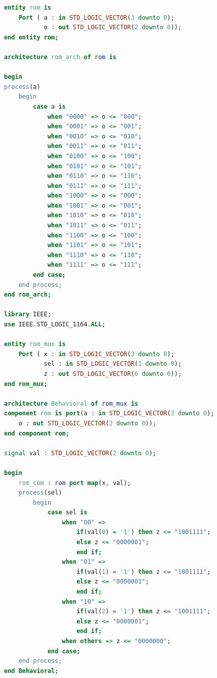 \documentclass[11pt]{article}
\begin{document}
\begin{appendices}
\begin{lstlisting}[language=VHDL]
entity rom is
    Port ( a : in STD_LOGIC_VECTOR(3 downto 0);
           o : out STD_LOGIC_VECTOR(2 downto 0));
end entity rom;

architecture rom_arch of rom is
    
begin
process(a)
    begin
        case a is
            when "0000" => o <= "000";
            when "0001" => o <= "001";
            when "0010" => o <= "010";
            when "0011" => o <= "011";
            when "0100" => o <= "100";
            when "0101" => o <= "101";
            when "0110" => o <= "110";
            when "0111" => o <= "111";
            when "1000" => o <= "000";
            when "1001" => o <= "001";
            when "1010" => o <= "010";
            when "1011" => o <= "011";
            when "1100" => o <= "100";
            when "1101" => o <= "101";
            when "1110" => o <= "110";
            when "1111" => o <= "111";
        end case;
    end process;
end rom_arch;

library IEEE;
use IEEE.STD_LOGIC_1164.ALL;

entity rom_mux is
    Port ( x : in STD_LOGIC_VECTOR(3 downto 0);
           sel : in STD_LOGIC_VECTOR(1 downto 0);
           z : out STD_LOGIC_VECTOR(6 downto 0));
end rom_mux;

architecture Behavioral of rom_mux is
component rom is port(a : in STD_LOGIC_VECTOR(3 downto 0); 
	o : out STD_LOGIC_VECTOR(2 downto 0));
end component rom;

signal val : STD_LOGIC_VECTOR(2 downto 0);

begin
    rom_com : rom port map(x, val);
    process(sel)
        begin
            case sel is
                when "00" => 
                    if(val(0) = '1') then z <= "1001111";
                    else z <= "0000001";
                    end if;
                when "01" =>
                    if(val(1) = '1') then z <= "1001111";
                    else z <= "0000001";
                    end if;
                when "10" => 
                    if(val(2) = '1') then z <= "1001111";
                    else z <= "0000001";
                    end if;
                when others => z <= "0000000";
            end case;
    end process;
end Behavioral;
\end{lstlisting}


\end{appendices}
\end{document}
